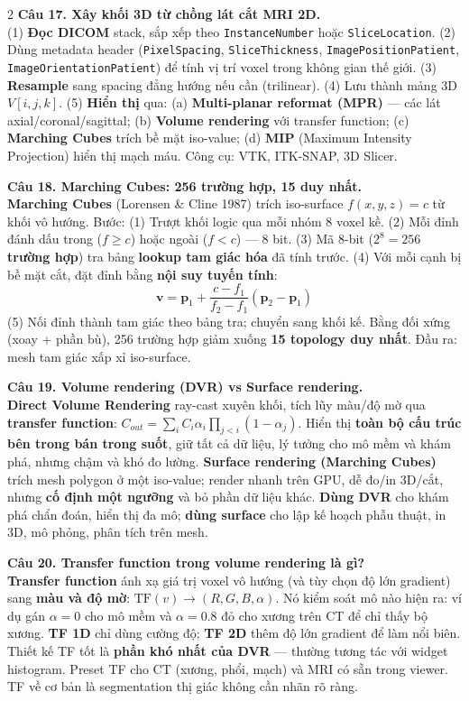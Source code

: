 \begin{paracol}{2}
\textbf{Câu 17. Xây khối 3D từ chồng lát cắt MRI 2D.}\\
(1) \textbf{Đọc DICOM} stack, sắp xếp theo \texttt{InstanceNumber} hoặc \texttt{SliceLocation}. (2) Dùng metadata header (\texttt{PixelSpacing}, \texttt{SliceThickness}, \texttt{ImagePositionPatient}, \texttt{ImageOrientationPatient}) để tính vị trí voxel trong không gian thế giới. (3) \textbf{Resample} sang spacing đẳng hướng nếu cần (trilinear). (4) Lưu thành mảng 3D $V[i,j,k]$. (5) \textbf{Hiển thị} qua: (a) \textbf{Multi-planar reformat (MPR)} --- các lát axial/coronal/sagittal; (b) \textbf{Volume rendering} với transfer function; (c) \textbf{Marching Cubes} trích bề mặt iso-value; (d) \textbf{MIP} (Maximum Intensity Projection) hiển thị mạch máu. Công cụ: VTK, ITK-SNAP, 3D Slicer.

\textbf{Câu 18. Marching Cubes: 256 trường hợp, 15 duy nhất.}\\
\textbf{Marching Cubes} (Lorensen \& Cline 1987) trích iso-surface $f(x,y,z) = c$ từ khối vô hướng. Bước: (1) Trượt khối logic qua mỗi nhóm 8 voxel kề. (2) Mỗi đỉnh đánh dấu trong ($f \geq c$) hoặc ngoài ($f < c$) --- 8 bit. (3) Mã 8-bit (\textbf{$2^8 = 256$ trường hợp}) tra bảng \textbf{lookup tam giác hóa} đã tính trước. (4) Với mỗi cạnh bị bề mặt cắt, đặt đỉnh bằng \textbf{nội suy tuyến tính}:
$$\mathbf{v} = \mathbf{p}_1 + \frac{c - f_1}{f_2 - f_1}(\mathbf{p}_2 - \mathbf{p}_1)$$
(5) Nối đỉnh thành tam giác theo bảng tra; chuyển sang khối kế. Bằng đối xứng (xoay + phần bù), 256 trường hợp giảm xuống \textbf{15 topology duy nhất}. Đầu ra: mesh tam giác xấp xỉ iso-surface.

\textbf{Câu 19. Volume rendering (DVR) vs Surface rendering.}\\
\textbf{Direct Volume Rendering} ray-cast xuyên khối, tích lũy màu/độ mờ qua \textbf{transfer function}: $C_{out} = \sum_i C_i \alpha_i \prod_{j<i}(1-\alpha_j)$. Hiển thị \textbf{toàn bộ cấu trúc bên trong bán trong suốt}, giữ tất cả dữ liệu, lý tưởng cho mô mềm và khám phá, nhưng chậm và khó đo lường. \textbf{Surface rendering (Marching Cubes)} trích mesh polygon ở một iso-value; render nhanh trên GPU, dễ đo/in 3D/cắt, nhưng \textbf{cố định một ngưỡng} và bỏ phần dữ liệu khác. \textbf{Dùng DVR} cho khám phá chẩn đoán, hiển thị đa mô; \textbf{dùng surface} cho lập kế hoạch phẫu thuật, in 3D, mô phỏng, phân tích trên mesh.

\textbf{Câu 20. Transfer function trong volume rendering là gì?}\\
\textbf{Transfer function} ánh xạ giá trị voxel vô hướng (và tùy chọn độ lớn gradient) sang \textbf{màu và độ mờ}: $\mathrm{TF}(v) \to (R,G,B,\alpha)$. Nó kiểm soát mô nào hiện ra: ví dụ gán $\alpha=0$ cho mô mềm và $\alpha=0.8$ đỏ cho xương trên CT để chỉ thấy bộ xương. \textbf{TF 1D} chỉ dùng cường độ; \textbf{TF 2D} thêm độ lớn gradient để làm nổi biên. Thiết kế TF tốt là \textbf{phần khó nhất của DVR} --- thường tương tác với widget histogram. Preset TF cho CT (xương, phổi, mạch) và MRI có sẵn trong viewer. TF về cơ bản là segmentation thị giác không cần nhãn rõ ràng.


\end{paracol}
